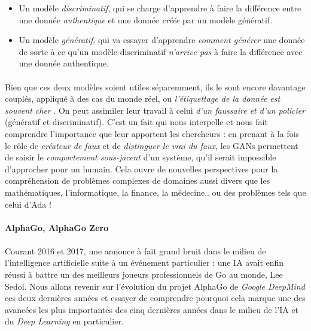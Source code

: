 \begin{itemize}
    \item Un modèle \emph{discriminatif}, qui se charge d'apprendre à faire la différence entre une donnée \emph{authentique}
    et une donnée \emph{créée} par un modèle génératif.
    \item Un modèle \emph{génératif}, qui va essayer d'apprendre \emph{comment générer} une donnée de sorte à ce 
    qu'un modèle discriminatif \emph{n'arrive pas} à faire la différence avec une donnée authentique.
\end{itemize} 

\paragraph{} Bien que ces deux modèles soient utiles séparemment, ils le sont encore davantage couplés, appliqué à des cas
du monde réel, ou \emph{l'étiquettage de la donnée est souvent cher} \cite{MachineLearning5}. On peut assimiler leur travail
à celui \emph{d'un faussaire et d'un policier} (génératif et discriminatif). C'est un fait qui nous interpelle et nous fait
comprendre l'importance que leur apportent les chercheurs : en prenant à la fois le rôle de \emph{créateur de faux} et de
\emph{distinguer le vrai du faux}, les GANs permettent de saisir le \emph{comportement sous-jacent} d'un système, qu'il serait
impossible d'approcher pour un humain. Cela ouvre de nouvelles perspectives pour la compréhension de problèmes complexes de
domaines aussi divers que les mathématiques, l'informatique, la finance, la médecine.. ou des problèmes tels que celui d'Ada !

\paragraph{AlphaGo, AlphaGo Zero}

\paragraph{} Courant 2016 et 2017, une annonce à fait grand bruit dans le milieu de l'intelligence artificielle
suite à un événement particulier : une IA avait enfin réussi à battre un des meilleurs joueurs professionnels de Go
au monde, Lee Sedol. Nous allons revenir sur l'évolution du projet AlphaGo de \emph{Google DeepMind} ces deux dernières
années et essayer de comprendre pourquoi cela marque une des avancées les plus importantes des cinq dernières années
dans le milieu de l'IA et du \emph{Deep Learning} en particulier.

